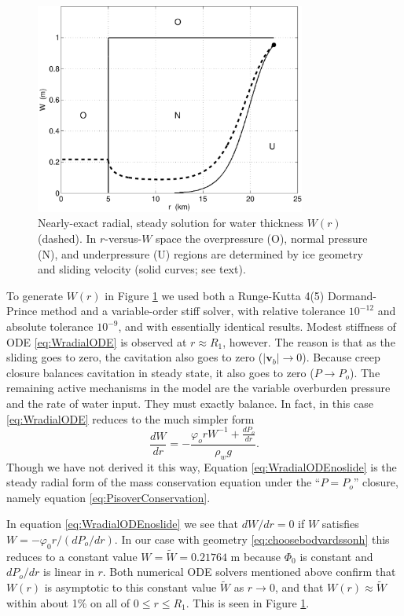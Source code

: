 \documentclass[11pt,final]{amsart}
\newcommand\bv{\mathbf{v}}
\begin{document}
\begin{figure}[ht]
\includegraphics[width=3.5in,keepaspectratio=true]{exact-W-plot-onu}
\caption{Nearly-exact radial, steady solution for water thickness $W(r)$ (dashed).  In $r$-versus-$W$ space the overpressure (O), normal pressure (N), and underpressure (U) regions are determined by ice geometry and sliding velocity (solid curves; see text).}
\label{fig:Wexact}
\end{figure}

To generate $W(r)$ in Figure \ref{fig:Wexact} we used both a Runge-Kutta 4(5) Dormand-Prince method and a variable-order stiff solver, with relative tolerance $10^{-12}$ and absolute tolerance $10^{-9}$, and with essentially identical results.  Modest stiffness \citep{AscherPetzold} of ODE \eqref{eq:WradialODE} is observed at $r\approx R_1$, however.  The reason is that as the sliding goes to zero, the cavitation also goes to zero ($|\bv_b|\to 0$).  Because creep closure balances cavitation in steady state, it also goes to zero ($P\to P_o$).  The remaining active mechanisms in the model are the variable overburden pressure and the rate of water input.  They must exactly balance.  In fact, in this case \eqref{eq:WradialODE} reduces to the much simpler form
\begin{equation}
\frac{dW}{dr} = - \frac{\varphi_o r W^{-1} + \frac{dP_o}{dr}}{\rho_w g}. \label{eq:WradialODEnoslide}
\end{equation}
Though we have not derived it this way, Equation \eqref{eq:WradialODEnoslide} is the steady radial form of the mass conservation equation under the ``$P=P_o$'' closure, namely equation \eqref{eq:PisoverConservation}.

In equation \eqref{eq:WradialODEnoslide} we see that $dW/dr=0$ if $W$ satisfies $W = - \varphi_0 r / (dP_o/dr)$.  In our case with geometry \eqref{eq:choosebodvardssonh} this reduces to a constant value $W=\tilde W= 0.21764$ m because $\Phi_0$ is constant and $dP_o/dr$ is linear in $r$.  Both numerical ODE solvers mentioned above confirm that $W(r)$ is asymptotic to this constant value $\tilde W$ as $r\to 0$, and that $W(r)\approx \tilde W$ within about 1\% on all of $0\le r \le R_1$.  This is seen in Figure \ref{fig:Wexact}.
\end{document}
